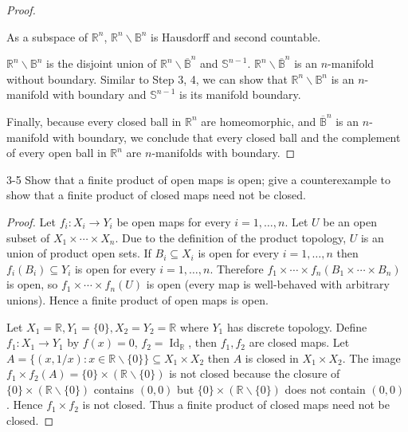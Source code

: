 \begin{proof}
\begin{enumerate}[label={\textbf{Step \arabic*.}},itemindent=1cm]
		      As a subspace of $\mathbb{R}^{n}$, $\mathbb{R}^{n}\smallsetminus \mathbb{B}^{n}$ is Hausdorff and second countable.

		      $\mathbb{R}^{n}\smallsetminus\mathbb{B}^{n}$ is the disjoint union of $\mathbb{R}^{n}\smallsetminus\overline{\mathbb{B}}^{n}$ and $\mathbb{S}^{n-1}$. $\mathbb{R}^{n}\smallsetminus\overline{\mathbb{B}}^{n}$ is an $n$-manifold without boundary. Similar to Step 3, 4, we can show that $\mathbb{R}^{n}\smallsetminus \mathbb{B}^{n}$ is an $n$-manifold with boundary and $\mathbb{S}^{n-1}$ is its manifold boundary.
	\end{enumerate}

	Finally, because every closed ball in $\mathbb{R}^{n}$ are homeomorphic, and $\overline{\mathbb{B}}^{n}$ is an $n$-manifold with boundary, we conclude that every closed ball and the complement of every open ball in $\mathbb{R}^{n}$ are $n$-manifolds with boundary.
\end{proof}

\begin{problem}{3-5}\label{problem:3-5}
Show that a finite product of open maps is open; give a counterexample to show that a finite product of closed maps need not be closed.
\end{problem}

\begin{proof}
	Let $f_{i}: X_{i}\to Y_{i}$ be open maps for every $i = 1,\ldots,n$. Let $U$ be an open subset of $X_{1}\times\cdots\times X_{n}$. Due to the definition of the product topology, $U$ is an union of product open sets. If $B_{i}\subseteq X_{i}$ is open for every $i = 1,\ldots,n$ then $f_{i}(B_{i})\subseteq Y_{i}$ is open for every $i = 1,\ldots,n$. Therefore $f_{1}\times\cdots\times f_{n}(B_{1}\times\cdots\times B_{n})$ is open, so $f_{1}\times\cdots\times f_{n}(U)$ is open (every map is well-behaved with arbitrary unions). Hence a finite product of open maps is open.

	Let $X_{1} = \mathbb{R}, Y_{1} = \{ 0 \}, X_{2} = Y_{2} = \mathbb{R}$ where $Y_{1}$ has discrete topology. Define $f_{1}: X_{1}\to Y_{1}$ by $f(x) = 0$, $f_{2} = \operatorname{Id}_{\mathbb{R}}$, then $f_{1}, f_{2}$ are closed maps. Let $A = \{ (x, 1/x): x\in\mathbb{R}\smallsetminus\{0\} \}\subseteq X_{1}\times X_{2}$ then $A$ is closed in $X_{1}\times X_{2}$. The image $f_{1}\times f_{2}(A) = \{ 0 \}\times (\mathbb{R}\smallsetminus\{0\})$ is not closed because the closure of $\{ 0 \}\times (\mathbb{R}\smallsetminus\{0\})$ contains $(0, 0)$ but $\{ 0 \}\times (\mathbb{R}\smallsetminus\{0\})$ does not contain $(0, 0)$. Hence $f_{1}\times f_{2}$ is not closed. Thus a finite product of closed maps need not be closed.
\end{proof}

